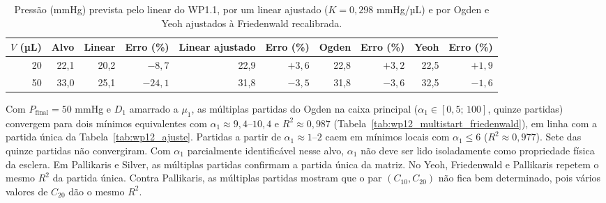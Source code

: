  
\begin{table}[h]
\centering
\caption{Pressão (mmHg) prevista pelo linear do WP1.1, por um linear ajustado ($K=0{,}298$ mmHg/µL) e por Ogden e Yeoh ajustados à Friedenwald recalibrada.}
\label{tab:wp12_linear}
\begin{tabular}{@{}rrrrrrrrrr@{}}
\toprule
$V$ (µL) & Alvo & Linear & Erro (\%) & Linear ajustado & Erro (\%) & Ogden & Erro (\%) & Yeoh & Erro (\%) \\
\midrule
20 & 22,1 & 20,2 & $-8{,}7$  & 22,9 & $+3{,}6$ & 22,8 & $+3{,}2$ & 22,5 & $+1{,}9$ \\
50 & 33,0 & 25,1 & $-24{,}1$ & 31,8 & $-3{,}5$ & 31,8 & $-3{,}6$ & 32,5 & $-1{,}6$ \\
\bottomrule
\end{tabular}
\end{table}
 
Com $P_{\text{final}}=50$ mmHg e $D_1$ amarrado a $\mu_1$, as múltiplas partidas do Ogden na caixa principal ($\alpha_1\in[0{,}5;\,100]$, quinze partidas) convergem para dois mínimos equivalentes com $\alpha_1\approx9{,}4$--$10{,}4$ e $R^2\approx0{,}987$ (Tabela~\ref{tab:wp12_multistart_friedenwald}), em linha com a partida única da Tabela~\ref{tab:wp12_ajuste}. Partidas a partir de $\alpha_1\approx1$--$2$ caem em mínimos locais com $\alpha_1\le6$ ($R^2\approx0{,}977$). Sete das quinze partidas não convergiram. Com $\alpha_1$ parcialmente identificável nesse alvo, $\alpha_1$ não deve ser lido isoladamente como propriedade física da esclera. Em Pallikaris e Silver, as múltiplas partidas confirmam a partida única da matriz. No Yeoh, Friedenwald e Pallikaris repetem o mesmo $R^2$ da partida única. Contra Pallikaris, as múltiplas partidas mostram que o par $(C_{10},C_{20})$ não fica bem determinado, pois vários valores de $C_{20}$ dão o mesmo $R^2$.
 
